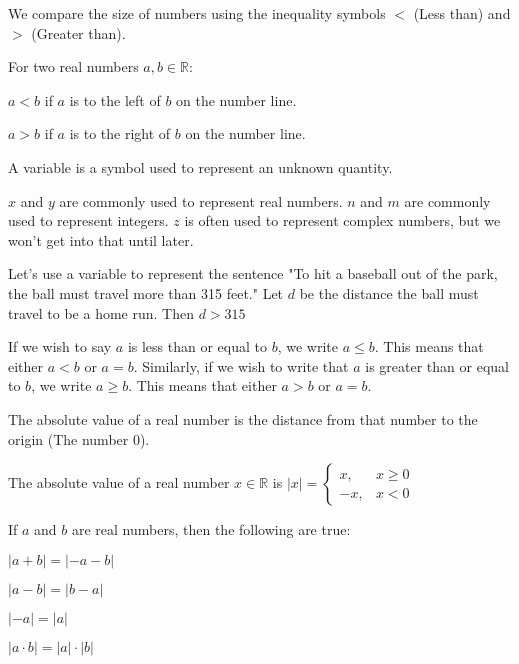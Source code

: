 \documentclass[crop=false,class=book,oneside]{standalone}
\begin{document}
        We compare the size of numbers using the inequality symbols $<$ (Less than) and $>$ (Greater than).
        \begin{properties}
        For two real numbers $a,b\in \mathbb{R}$:
        \begin{enumerate}
        \begin{multicols}{2}
        \item $a<b$ if $a$ is to the left of $b$ on the number line.
        \item $a>b$ if $a$ is to the right of $b$ on the number line.
        \end{multicols}
        \end{enumerate}
        \end{properties}
        \begin{definition}
        A variable is a symbol used to represent an unknown quantity.
        \end{definition}
        \begin{example}
        $x$ and $y$ are commonly used to represent real numbers. $n$ and $m$ are commonly used to represent integers. $z$ is often used to represent complex numbers, but we won't get into that until later.
        \end{example}
        \begin{example}
        Let's use a variable to represent the sentence "To hit a baseball out of the park, the ball must travel more than 315 feet." Let $d$ be the distance the ball must travel to be a home run. Then $d>315$
        \end{example}
        \begin{notation}
        If we wish to say $a$ is less than or equal to $b$, we write $a\leq b$. This means that either $a<b$ or $a=b$. Similarly, if we wish to write that $a$ is greater than or equal to $b$, we write $a\geq b$. This means that either $a>b$ or $a=b$.
        \end{notation}
        The absolute value of a real number is the distance from that number to the origin (The number $0$).
        \begin{definition}
        The absolute value of a real number $x\in \mathbb{R}$ is $|x| = \begin{cases} x, & x \geq 0 \\ -x, & x<0 \end{cases}$
        \end{definition}
        \begin{theorem}
        If $a$ and $b$ are real numbers, then the following are true:
        \begin{enumerate}
        \begin{multicols}{4}
        \item $|a+b| = |-a-b|$
        \item $|a-b| = |b-a|$
        \item $|-a| = |a|$
        \item $|a\cdot b| = |a|\cdot |b|$
        \end{multicols}
        \end{enumerate}
        \end{theorem}
        
\end{document}
